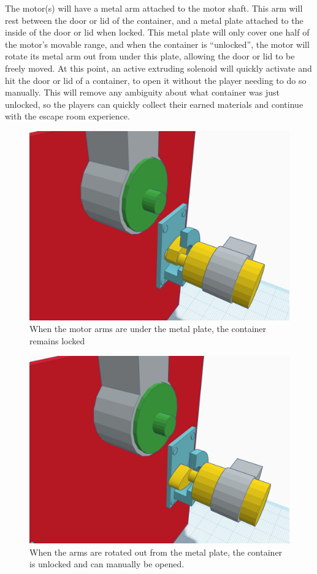 \documentclass[conference]{IEEEtran}
\begin{document}
\indent The motor(s) will have a metal arm attached to the motor shaft. This arm will rest between the
door or lid of the container, and a metal plate attached to the inside of the door or lid when locked.
This metal plate will only cover one half of the motor's movable range, and when the container is ``unlocked'',
the motor will rotate its metal arm out from under this plate, allowing the door or lid to be freely moved.
At this point, an active extruding solenoid will quickly activate and hit the door or lid of a container, to
open it without the player needing to do so manually. This will remove any ambiguity about what container
was just unlocked, so the players can quickly collect their earned materials and continue with the escape room
experience.

\begin{figure}[H]
    \centering
    \includegraphics[width=0.85\columnwidth]{Images/ClosedLock.png}
    \caption{When the motor arms are under the metal plate, the container remains locked}
\end{figure}

\begin{figure}[H]
    \centering
    \includegraphics[width=0.85\columnwidth]{Images/OpenLock.png}
    \caption{When the arms are rotated out from the metal plate, the container is unlocked and can manually be opened.}
\end{figure}
\end{document}
